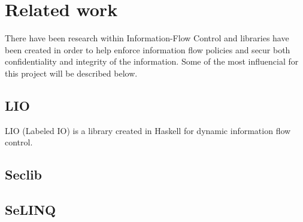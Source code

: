 \section{Related work}
There have been research within Information-Flow Control and libraries have been created in order to help enforce information flow policies and secur both confidentiality and integrity of the information. Some of the most influencial for this project will be described below.
\subsection{LIO}
LIO (Labeled IO) is a library created in Haskell for dynamic information flow control.\cite{lio-2011} 
\subsection{Seclib}

\subsection{SeLINQ}
